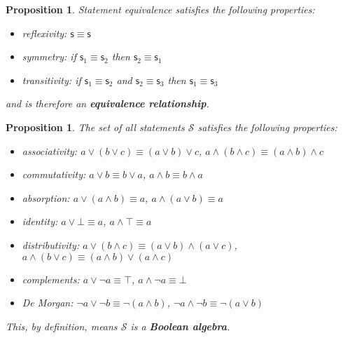 \documentclass[letterpaper]{article}
\theoremstyle{plain}%
\newtheorem{prop}[thrm]{Proposition}
\theoremstyle{definition}
\theoremstyle{remark}
\def\tautology{\top}
\def\contradiction{\bot}
\def\AND{\wedge}
\def\OR{\vee}
\def\NOT{\neg}
\newcommand{\stmt}[1][s] {\mathsf{#1}}
\begin{document}
\begin{prop}
	Statement equivalence satisfies the following properties:
	\begin{itemize}
		\item reflexivity: $\stmt \equiv \stmt$
		\item symmetry: if $\stmt_1 \equiv \stmt_2$ then $\stmt_2 \equiv \stmt_1$
		\item transitivity: if $\stmt_1 \equiv \stmt_2$ and $\stmt_2 \equiv \stmt_3$ then $\stmt_1 \equiv \stmt_3$
	\end{itemize}
	and is therefore an \textbf{equivalence relationship}.
\end{prop}

\begin{prop}\label{boolean_properties}
	The set of all statements $\mathcal{S}$ satisfies the following properties:
	\begin{itemize}
		\item associativity: $a \OR (b \OR c) \equiv (a \OR b) \OR c$, $a \AND (b \AND c) \equiv (a \AND b) \AND c$
		\item commutativity: $a \OR b \equiv b \OR a$, $a \AND b \equiv b \AND a$
		\item absorption: $a \OR (a \AND b) \equiv a$, $a \AND (a \OR b) \equiv a$
		\item identity: $a \OR \contradiction \equiv a
		$, $a \AND \tautology \equiv a$
		\item distributivity: $a \OR (b \AND c) \equiv (a \OR b) \AND (a \OR c)$, $a \AND (b \OR c) \equiv (a \AND b) \OR (a \AND c)$
		\item complements: $a \OR \NOT a \equiv \tautology$, $a \AND \NOT a \equiv \contradiction$
		\item De Morgan: $\NOT a \OR \NOT b \equiv \NOT (a \AND b)$, $\NOT a \AND \NOT b \equiv \NOT (a \OR b)$
	\end{itemize}
	This, by definition, means $\mathcal{S}$ is a \textbf{Boolean algebra}.
\end{prop}
\end{document}
